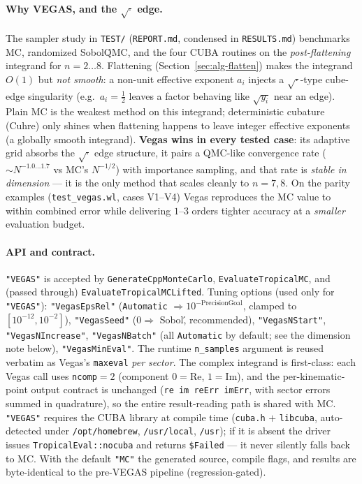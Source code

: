 \documentclass[11pt,a4paper]{article}
\begin{document}
\paragraph{Why VEGAS, and the $\sqrt{\cdot}$ edge.} The sampler study in
\texttt{TEST/} (\texttt{REPORT.md}, condensed in \texttt{RESULTS.md}) benchmarks
MC, randomized Sobol\' QMC, and the four CUBA routines on the
\emph{post-flattening} integrand for $n=2\dots8$. Flattening
(Section~\ref{sec:alg-flatten}) makes the integrand $O(1)$ but \emph{not
smooth}: a non-unit effective exponent $a_i$ injects a $\sqrt{\cdot}$-type
cube-edge singularity (e.g.\ $a_i=\tfrac12$ leaves a factor behaving like
$\sqrt{y_i}$ near an edge). Plain MC is the weakest method on this integrand;
deterministic cubature (Cuhre) only shines when flattening happens to leave
integer effective exponents (a globally smooth integrand). \textbf{Vegas wins in
every tested case}: its adaptive grid absorbs the $\sqrt{\cdot}$ edge structure,
it pairs a QMC-like convergence rate ($\sim N^{-1.0\dots1.7}$ vs MC's
$N^{-1/2}$) with importance sampling, and that rate is \emph{stable in
dimension} --- it is the only method that scales cleanly to $n=7,8$. On the
parity examples (\texttt{test\_vegas.wl}, cases V1--V4) Vegas reproduces the MC
value to within combined error while delivering $1$--$3$ orders tighter accuracy
at a \emph{smaller} evaluation budget.

\paragraph{API and contract.} \texttt{"VEGAS"} is accepted by
\texttt{GenerateCppMonteCarlo}, \texttt{EvaluateTropicalMC}, and (passed
through) \texttt{EvaluateTropicalMCLifted}. Tuning options (used only for
\texttt{"VEGAS"}): \texttt{"VegasEpsRel"} (\texttt{Automatic} $\Rightarrow
10^{-\text{PrecisionGoal}}$, clamped to $[10^{-12},10^{-2}]$),
\texttt{"VegasSeed"} ($0\Rightarrow$ Sobol\', recommended),
\texttt{"VegasNStart"}, \texttt{"VegasNIncrease"}, \texttt{"VegasNBatch"}
(all \texttt{Automatic} by default; see the dimension note below),
\texttt{"VegasMinEval"}. The runtime \texttt{n\_samples} argument is reused
verbatim as Vegas's \texttt{maxeval} \emph{per sector}. The complex integrand is
first-class: each Vegas call uses \texttt{ncomp}${}=2$ (component $0={}$Re,
$1={}$Im), and the per-kinematic-point output contract is unchanged
(\texttt{re im reErr imErr}, with sector errors summed in quadrature), so the
entire result-reading path is shared with MC. \texttt{"VEGAS"} requires the CUBA
library at compile time (\texttt{cuba.h} $+$ \texttt{libcuba}, auto-detected
under \texttt{/opt/homebrew}, \texttt{/usr/local}, \texttt{/usr}); if it is
absent the driver issues \texttt{TropicalEval::nocuba} and returns
\texttt{\$Failed} --- it never silently falls back to MC. With the default
\texttt{"MC"} the generated source, compile flags, and results are
byte-identical to the pre-VEGAS pipeline (regression-gated).
\end{document}
